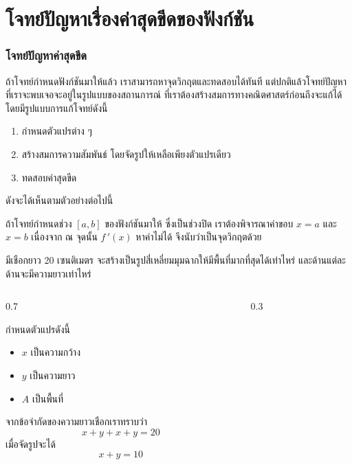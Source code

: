 \section[โจทย์ปัญหาค่าสุดขีด]{โจทย์ปัญหาเรื่องค่าสุดขีดของฟังก์ชัน}
\frame{\sectionpage}

\begin{frame}
\frametitle{โจทย์ปัญหาค่าสุดขีด}
ถ้าโจทย์กำหนดฟังก์ชันมาให้แล้ว เราสามารถหาจุดวิกฤตและทดสอบได้ทันที แต่ปกติแล้วโจทย์ปัญหาที่เราจะพบเจอจะอยู่ในรูปแบบของสถานการณ์ ที่เราต้องสร้างสมการทางคณิตศาสตร์ก่อนถึงจะแก้ได้ โดยมีรูปแบบการแก้โจทย์ดังนี้
\begin{enumerate}
\item กำหนดตัวแปรต่าง ๆ
\item สร้างสมการความสัมพันธ์ โดยจัดรูปให้เหลือเพียงตัวแปรเดียว
\item ทดสอบค่าสุดขีด
\end{enumerate}
ดังจะได้เห็นตามตัวอย่างต่อไปนี้

\begin{remark}{}
ถ้าโจทย์กำหนดช่วง $[a,b]$ ของฟังก์ชันมาให้ ซึ่งเป็นช่วงปิด เราต้องพิจารณาค่าขอบ $x=a$ และ $x=b$ เนื่องจาก ณ จุดนั้น $f\,'(x)$ หาค่าไม่ได้ จึงนับว่าเป็นจุดวิกฤตด้วย
\end{remark}
\end{frame}


\begin{frame}[t]
\begin{ex}
มีเชือกยาว 20 เซนติเมตร จะสร้างเป็นรูปสี่เหลี่ยมมุมฉากให้มีพื้นที่มากที่สุดได้เท่าไหร่ และด้านแต่ละด้านจะมีความยาวเท่าไหร่
\end{ex} 
\begin{columns}
\begin{column}{0.7\textwidth}
\begin{sol} กำหนดตัวแปรดังนี้
\begin{itemize}
\item $x$ เป็นความกว้าง 
\item $y$ เป็นความยาว 
\item $A$ เป็นพื้นที่ 
\end{itemize}
จากข้อจำกัดของความยาวเชือกเราทราบว่า
\[x+y+x+y = 20\] 
เมื่อจัดรูปจะได้
\[x+y = 10\]
\end{sol}
\end{column}
\begin{column}{0.3\textwidth}
\end{column}
\end{columns}
\end{frame}

